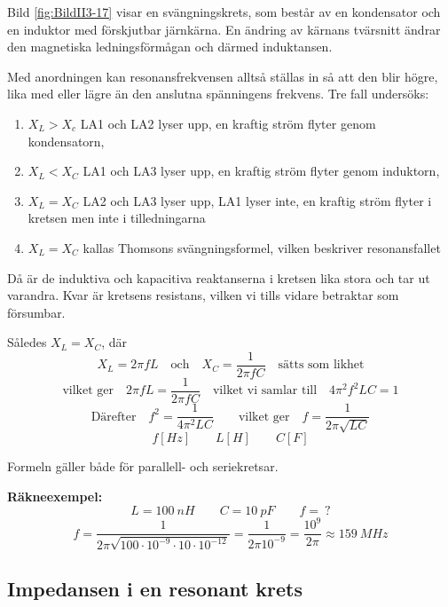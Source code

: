 Bild \ref{fig:BildII3-17} visar en svängningskrets, som består av en
kondensator och en induktor med förskjutbar järnkärna.
En ändring av kärnans tvärsnitt ändrar den magnetiska ledningsförmågan och
därmed induktansen.

Med anordningen kan resonansfrekvensen alltså ställas in så att den blir högre,
lika med eller lägre än den anslutna spänningens frekvens.
Tre fall undersöks:
\begin{enumerate}
\item \(X_L > X_c\) LA1 och LA2 lyser upp, en kraftig ström flyter genom
  kondensatorn,
\item \(X_L < X_C\) LA1 och LA3 lyser upp, en kraftig ström flyter genom
  induktorn,
\item \(X_L= X_C\) LA2 och LA3 lyser upp, LA1 lyser inte, en kraftig ström
  flyter i kretsen men inte i tilledningarna
\item \(X_L = X_C\) kallas Thomsons svängningsformel, vilken beskriver
  resonansfallet
\end{enumerate}

Då är de induktiva och kapacitiva reaktanserna i kretsen lika stora och tar ut
varandra.
Kvar är kretsens resistans, vilken vi tills vidare betraktar som försumbar.

Således \(X_L = X_C\), där
\[
  X_L = 2\pi fL \quad \text{och} \quad  
  X_C = \frac{1}{2\pi fC} \quad \text{sätts som likhet}
\]
\[
  \text{vilket ger} \quad 2\pi fL = \frac{1}{2\pi fC} \quad 
  \text{vilket vi samlar till} \quad 4\pi ^2f^2LC = 1 
\]
\[
  \text{Därefter} \quad f^2 = \frac{1}{4\pi ^2LC} \qquad 
  \text{vilket ger} \quad f = \frac{1}{2\pi \sqrt{LC}}
\]
\[
  f\unit{[Hz]} \qquad L\unit{[H]} \qquad C\unit{[F]}
\]


Formeln gäller både för parallell- och seriekretsar.

\noindent \textbf{Räkneexempel:}
\[ L = \SI{100}{nH} \qquad C = \SI{10}{pF} \qquad f =\ ? \]
\[
 f = \frac{1}{2\pi \sqrt{100 \cdot 10^{-9} \cdot 10 \cdot 10^{-12}}}
   = \frac{1}{2\pi 10^{-9}} 
   = \frac{10^9}{2\pi } 
   \approx \SI{159}{MHz}
\]

\subsection{Impedansen i en resonant krets}


